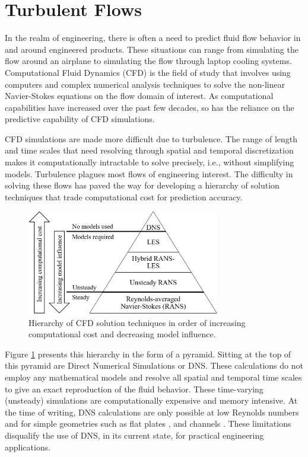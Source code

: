 \section{Turbulent Flows}

In the realm of engineering, there is often a need to predict fluid flow behavior in and around engineered products.
These situations can range from simulating the flow around an airplane to simulating the flow through laptop cooling systems.
Computational Fluid Dynamics (CFD) is the field of study that involves using computers and complex numerical analysis techniques to solve the non-linear Navier-Stokes equations on the flow domain of interest.
As computational capabilities have increased over the past few decades, so has the reliance on the predictive capability of CFD simulations. 

CFD simulations are made more difficult due to turbulence.
The range of length and time scales that need resolving through spatial and temporal discretization makes it computationally intractable to solve precisely, i.e., without simplifying models.
Turbulence plagues most flows of engineering interest.
The difficulty in solving these flows has paved the way for developing a hierarchy of solution techniques that trade computational cost for prediction accuracy. 

\begin{figure}
    \center
    \includegraphics[width=0.75\textwidth]{suthesis/images/solution_heirarchy_simple.png}
    \caption{Hierarchy of CFD solution techniques in order of increasing computational cost and decreasing model influence. \label{fig:cfd_types}}
\end{figure}

Figure \ref{fig:cfd_types} presents this hierarchy in the form of a pyramid.
Sitting at the top of this pyramid are Direct Numerical Simulations or DNS.
These calculations do not employ any mathematical models and resolve all spatial and temporal time scales to give an exact reproduction of the fluid behavior.
These time-varying (unsteady) simulations are computationally expensive and memory intensive.
At the time of writing, DNS calculations are only possible at low Reynolds numbers and for simple geometries such as flat plates \cite{hoyas_reynolds_2008}, and channels \cite{laval_marquillie_dns_channel,marquillie_instability_2011}.
These limitations disqualify the use of DNS, in its current state, for practical engineering applications. 

